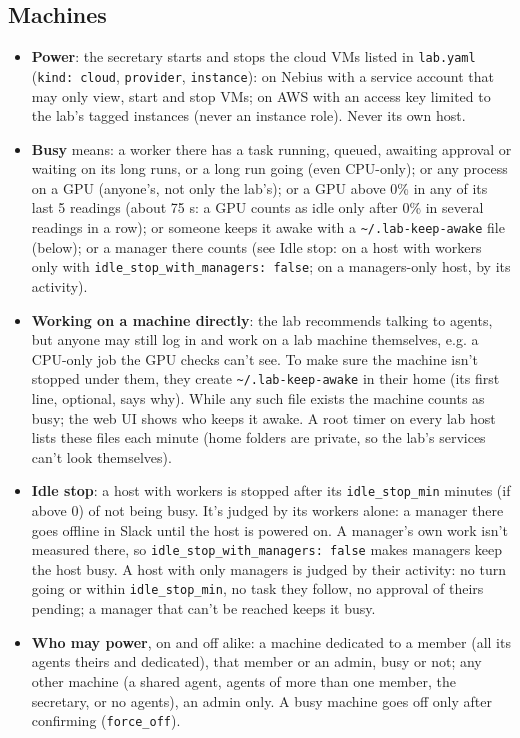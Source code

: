 \documentclass[11pt]{article}
\newcommand{\code}[1]{\texttt{#1}}
\begin{document}
\subsection{Machines}
\begin{itemize}
  \item \textbf{Power}: the secretary starts and stops the cloud VMs listed in
    \code{lab.yaml} (\code{kind: cloud}, \code{provider}, \code{instance}): on Nebius with
    a service account that may only view, start and stop VMs; on AWS with an access key
    limited to the lab's tagged instances (never an instance role). Never its own host.
  \item \textbf{Busy} means: a worker there has a task running, queued, awaiting
    approval or waiting on its long runs, or a long run going (even CPU-only); or any process on a GPU (anyone's, not only the lab's); or a GPU above 0\%
    in any of its last 5 readings (about 75 s: a GPU counts as idle only after 0\% in
    several readings in a row); or someone keeps it awake with a \code{\textasciitilde/.lab-keep-awake}
    file (below); or a manager there counts (see Idle stop: on a host with workers only
    with \code{idle\_stop\_with\_managers: false}; on a managers-only host, by its activity).
  \item \textbf{Working on a machine directly}: the lab recommends talking to agents, but
    anyone may still log in and work on a lab machine themselves, e.g. a CPU-only job the
    GPU checks can't see. To make sure the machine isn't stopped under them, they create
    \code{\textasciitilde/.lab-keep-awake} in their home (its first line, optional, says
    why). While any such file exists the machine counts as busy; the web UI shows who keeps
    it awake. A root timer on every lab host lists these files each minute (home folders
    are private, so the lab's services can't look themselves).
  \item \textbf{Idle stop}: a host with workers is stopped after its
    \code{idle\_stop\_min} minutes (if above 0) of not being busy. It's judged by its workers alone: a
    manager there goes offline in Slack until the host is powered on. A manager's own work
    isn't measured there, so \code{idle\_stop\_with\_managers: false} makes managers keep
    the host busy. A host with only managers is judged by their activity: no turn going or
    within \code{idle\_stop\_min}, no task they follow, no approval of theirs pending; a
    manager that can't be reached keeps it busy.
  \item \textbf{Who may power}, on and off alike: a machine dedicated to a member (all its
    agents theirs and dedicated), that member or an admin, busy or not; any other machine
    (a shared agent, agents of more than one member, the secretary, or no agents), an admin
    only. A busy machine goes off only after confirming (\code{force\_off}).
\end{itemize}
\end{document}
